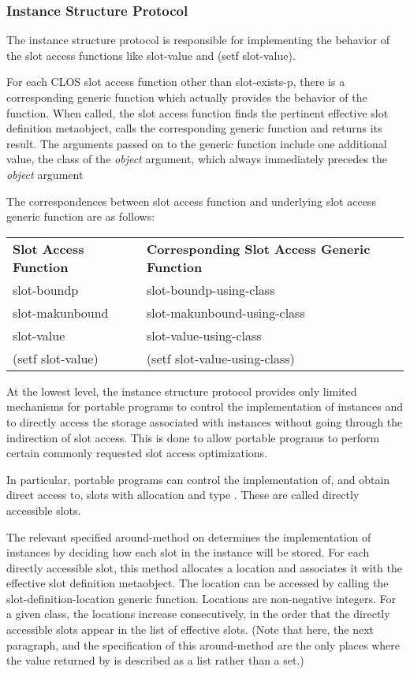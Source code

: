 \subsubsection{Instance Structure Protocol}
\label{INSTANCE-STRUCTURE-PROTOCOL}

The instance structure protocol is responsible for implementing the behavior of
the slot access functions like slot-value and (setf slot-value). 

For each CLOS slot access function other than slot-exists-p, there is a
corresponding generic function which actually provides the behavior of the
function. When called, the slot access function finds the pertinent effective
slot definition metaobject, calls the corresponding generic function and returns
its result. The arguments passed on to the generic function include one
additional value, the class of the \emph{object} argument, which always immediately
precedes the \emph{object} argument 

The correspondences between slot access function and underlying slot access
generic function are as follows: 

\begin{tabular}{|@{}l|l@{}|}
\textbf{Slot Access Function}&\textbf{Corresponding Slot Access Generic Function}\\
slot-boundp&slot-boundp-using-class\\
slot-makunbound&slot-makunbound-using-class\\
slot-value&slot-value-using-class\\
(setf slot-value)&(setf slot-value-using-class)\\
\end{tabular}

At the lowest level, the instance structure protocol provides only limited
mechanisms for portable programs to control the implementation of instances and
to directly access the storage associated with instances without going through
the indirection of slot access. This is done to allow portable programs to
perform certain commonly requested slot access optimizations. 

In particular, portable programs can control the implementation of, and obtain
direct access to, slots with allocation  and type . These are called
directly accessible slots. 

The relevant specified around-method on  determines the
implementation of instances by deciding how each slot in the instance will be
stored. For each directly accessible slot, this method allocates a location and
associates it with the effective slot definition metaobject. The location can be
accessed by calling the slot-definition-location generic function. Locations are
non-negative integers. For a given class, the locations increase consecutively,
in the order that the directly accessible slots appear in the list of effective
slots. (Note that here, the next paragraph, and the specification of this
around-method are the only places where the value returned by  is
described as a list rather than a set.) 

